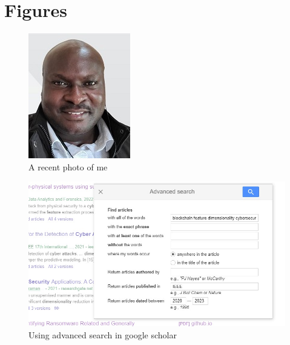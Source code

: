 \documentclass{article}
\begin{document}
\section{Figures}
\begin{figure}[H]
 \centering
 \includegraphics[width = .5\textwidth]{images/myImage2.jpg}
 \caption{A recent photo of me}
 \label{fig:float}
\end{figure}
\begin{figure}[H]
 \centering
  \includegraphics{images/myImage4.jpg}
 \caption{Using advanced search in google scholar}
 \label{fig:2}
\end{figure}
\end{document}
